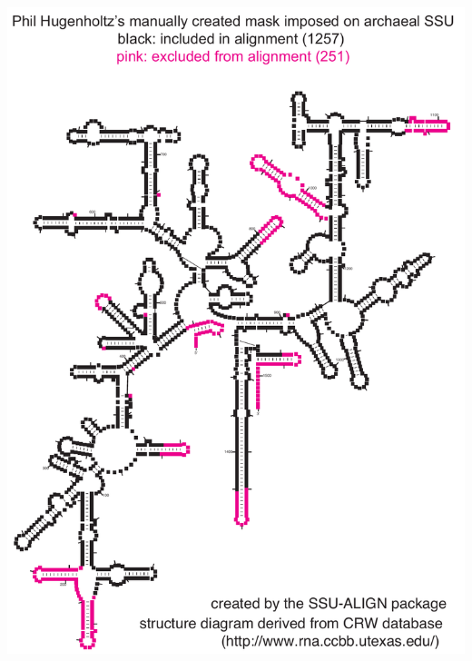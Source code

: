 \documentclass[landscape]{slides}
\begin{document}
\begin{slide}
%
\begin{center}
\includegraphics[height=8in]{figs/archaea-mask-ph-only}

\end{center}
\vfill
\end{slide}
\end{document}
